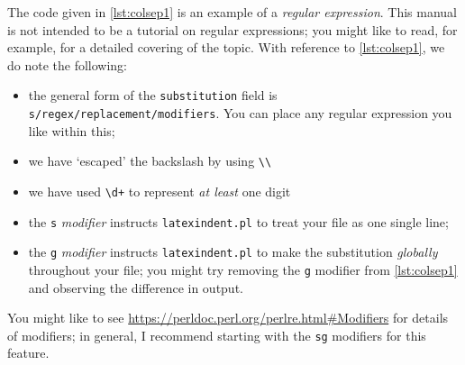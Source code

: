 \begin{example}
        The code given in \cref{lst:colsep1} is an example of a \emph{regular expression}. 
This manual is not intended to be
a tutorial on regular expressions; you might like to read, for example, \cite{masteringregexp} for a detailed
covering of the topic. With reference to \cref{lst:colsep1}, we do note the following:
  \begin{itemize}
    \item the general form of the \texttt{substitution} field is \lstinline!s/regex/replacement/modifiers!. You can 
      place any regular expression you like within this; 
    \item we have `escaped' the backslash by using \lstinline!\\! 
    \item we have used \lstinline!\d+! to represent \emph{at least} one digit
    \item the \texttt{s} \emph{modifier} instructs \texttt{latexindent.pl} to treat your file as one single line;
    \item the \texttt{g} \emph{modifier} instructs \texttt{latexindent.pl} to make the substitution \emph{globally} throughout 
      your file; you might try removing the \texttt{g} modifier from \cref{lst:colsep1} and observing the difference in output.
  \end{itemize}
  You might like to see \href{https://perldoc.perl.org/perlre.html#Modifiers}{https://perldoc.perl.org/perlre.html\#Modifiers}
  for details of modifiers; in general, I recommend starting with the \texttt{sg} modifiers for this feature.
\end{example}

